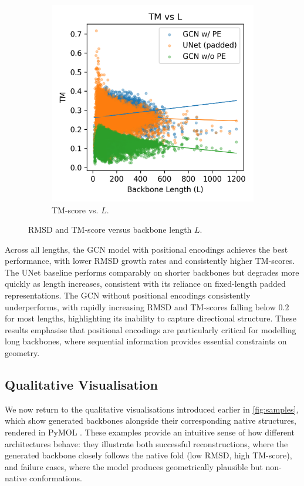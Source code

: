 \documentclass[a4paper,12pt]{article}
\begin{document}
\begin{figure}[htbp]
\begin{subfigure}[b]{0.495\textwidth}
        \includegraphics[width=\linewidth]{tm_vs_L.png}
        \caption{TM-score vs. \(L\).}
        \label{fig:tm-vs-l}
    \end{subfigure}
    \caption{RMSD and TM-score versus backbone length \(L\).}
    \label{fig:rmsd-tm-vs-l}
\end{figure}

Across all lengths, the GCN model with positional encodings achieves the best performance, with lower RMSD growth rates and consistently higher TM-scores. The UNet baseline performs comparably on shorter backbones but degrades more quickly as length increases, consistent with its reliance on fixed-length padded representations. The GCN without positional encodings consistently underperforms, with rapidly increasing RMSD and TM-scores falling below \(0.2\) for most lengths, highlighting its inability to capture directional structure. These results emphasise that positional encodings are particularly critical for modelling long backbones, where sequential information provides essential constraints on geometry.

\subsection{Qualitative Visualisation}\label{subsec:visualisation}
We now return to the qualitative visualisations introduced earlier in \cref{fig:samples}, which show generated backbones alongside their corresponding native structures, rendered in PyMOL \citep{PyMOL,JyMOL,AxPyMOL}. These examples provide an intuitive sense of how different architectures behave: they illustrate both successful reconstructions, where the generated backbone closely follows the native fold (low RMSD, high TM-score), and failure cases, where the model produces geometrically plausible but non-native conformations.
\end{document}
